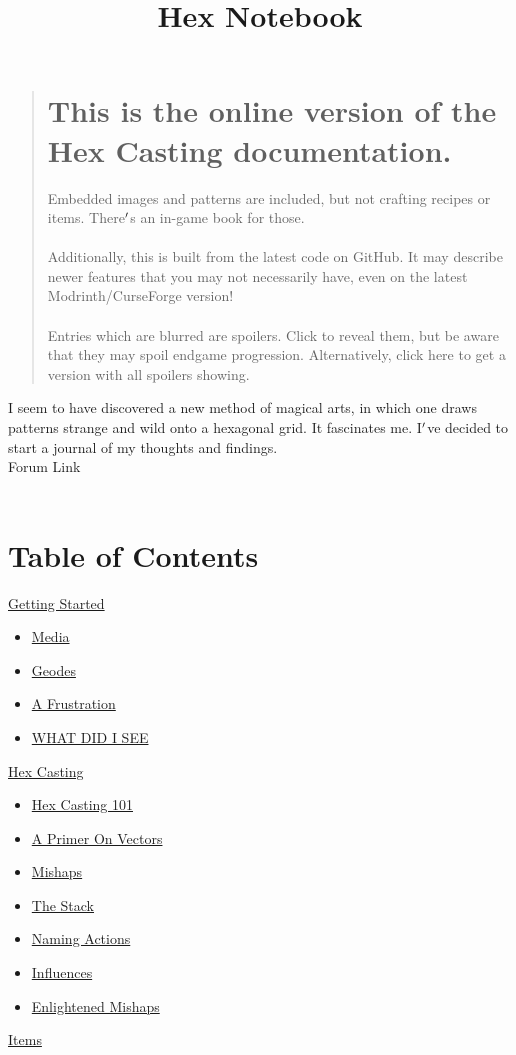 \documentclass[12pt]{article}
\begin{document}
\begin{quote}
  \section*{ This is the online version of the Hex Casting documentation.\\ }
  Embedded images and patterns are included, but not crafting recipes or items. There$\rq$s an in-game book for those.\\\\
    Additionally, this is built from the latest code on GitHub. It may describe newer features that you may not necessarily have, even on the latest Modrinth/CurseForge version!\\\\
  Entries which are blurred are spoilers. Click to reveal them, but be aware that they may spoil endgame progression. Alternatively, click here to get a version with all spoilers showing.\\

\end{quote}
  \title{ Hex Notebook }
  I seem to have discovered a new method of magical arts, in which one draws patterns strange and wild onto a hexagonal grid. It fascinates me. I$\rq$ve decided to start a journal of my thoughts and findings.\\Forum Link\\\\

\section*{ Table of Contents }


    \hyperref[ sec:basics ]{ Getting Started}

    \begin{itemize}
        \item\hyperref[ sec:basics/media ]{ Media}
        \item\hyperref[ sec:basics/geodes ]{ Geodes}
        \item\hyperref[ sec:basics/couldnt_cast ]{ A Frustration}
        \item\hyperref[ sec:basics/start_to_see ]{ WHAT DID I SEE}
    \end{itemize}
    \hyperref[ sec:casting ]{ Hex Casting}

    \begin{itemize}
        \item\hyperref[ sec:casting/101 ]{ Hex Casting 101}
        \item\hyperref[ sec:casting/vectors ]{ A Primer On Vectors}
        \item\hyperref[ sec:casting/mishaps ]{ Mishaps}
        \item\hyperref[ sec:casting/stack ]{ The Stack}
        \item\hyperref[ sec:casting/naming ]{ Naming Actions}
        \item\hyperref[ sec:casting/influences ]{ Influences}
        \item\hyperref[ sec:casting/mishaps2 ]{ Enlightened Mishaps}
    \end{itemize}
    \hyperref[ sec:items ]{ Items}
\end{document}
